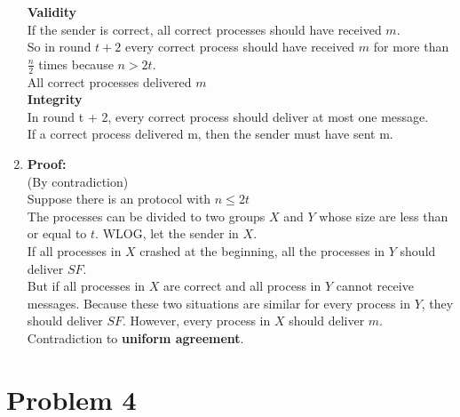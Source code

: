 \documentclass[12pt]{article}
\begin{document}
\begin{enumerate}
\textbf{Validity}\\

If the sender is correct, all correct processes should have received $m$.\\
So in round $t + 2$ every correct process should have received $m$ for more than $\frac{n}{2}$ times because $n>2t$.\\
All correct processes delivered $m$\\

\textbf{Integrity}\\

In round t + 2, every correct process should deliver at most one message.\\
If a correct process delivered m, then the sender must have sent m.\\

\item
\textbf{\large Proof:}\\

(By contradiction)\\
Suppose there is an protocol with $n\leq 2t$\\
The processes can be divided to two groups $X$ and $Y$ whose size are less than or equal to $t$. WLOG, let the sender in $X$.\\
If all processes in $X$ crashed at the beginning, all the processes in $Y$ should deliver $SF$.\\
But if all processes in $X$ are correct and all process in $Y$ cannot receive messages. Because these two situations are similar for every process in $Y$, they should deliver $SF$. However, every process in $X$ should deliver $m$.\\
Contradiction to \textbf{uniform agreement}.\\
\end{enumerate}

\section*{Problem 4}
\end{document}
